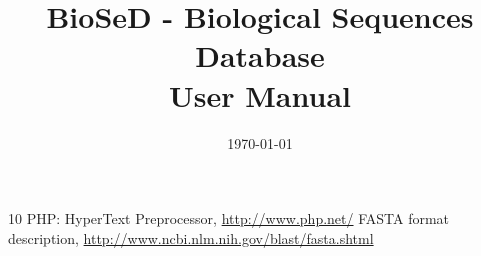 \documentclass[a4paper,11pt]{article}
\begin{document}
  \title{BioSeD - \textbf{Bio}logical \textbf{Se}quences \textbf{D}atabase\\\textbf{User Manual}}

  \date{\today}


  \maketitle


  \tableofcontents
  \listoffigures
  \listoftables
  \lstlistoflistings
  \clearpage




\clearpage
\renewcommand{\bibname}{References} 
\begin{thebibliography}
  {10}
   PHP: HyperText Preprocessor, \url{http://www.php.net/}
	 FASTA format description, \url{http://www.ncbi.nlm.nih.gov/blast/fasta.shtml}
	  
\end{thebibliography}
\end{document}
